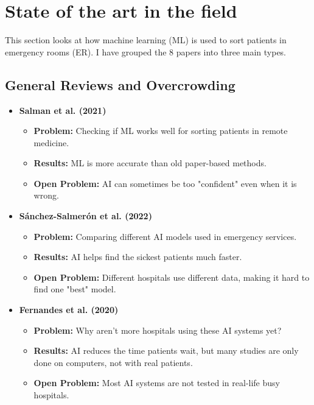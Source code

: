 \documentclass{article}
\begin{document}
\section{State of the art in the field}

This section looks at how machine learning (ML) is used to sort patients in emergency rooms (ER). I have grouped the 8 papers into three main types.

\subsection{General Reviews and Overcrowding}

\begin{itemize}
    \item \textbf{Salman et al. (2021) \cite{Salman2021}}
    \begin{itemize}
        \item \textbf{Problem:} Checking if ML works well for sorting patients in remote medicine.
        \item \textbf{Results:} ML is more accurate than old paper-based methods.
        \item \textbf{Open Problem:} AI can sometimes be too "confident" even when it is wrong.
    \end{itemize}

    \item \textbf{Sánchez-Salmerón et al. (2022) \cite{Sanchez2022}}
    \begin{itemize}
        \item \textbf{Problem:} Comparing different AI models used in emergency services.
        \item \textbf{Results:} AI helps find the sickest patients much faster.
        \item \textbf{Open Problem:} Different hospitals use different data, making it hard to find one "best" model.
    \end{itemize}

    \item \textbf{Fernandes et al. (2020) \cite{FernandesReview}}
    \begin{itemize}
        \item \textbf{Problem:} Why aren't more hospitals using these AI systems yet?
        \item \textbf{Results:} AI reduces the time patients wait, but many studies are only done on computers, not with real patients.
        \item \textbf{Open Problem:} Most AI systems are not tested in real-life busy hospitals.
    \end{itemize}


\end{itemize}
\end{document}
